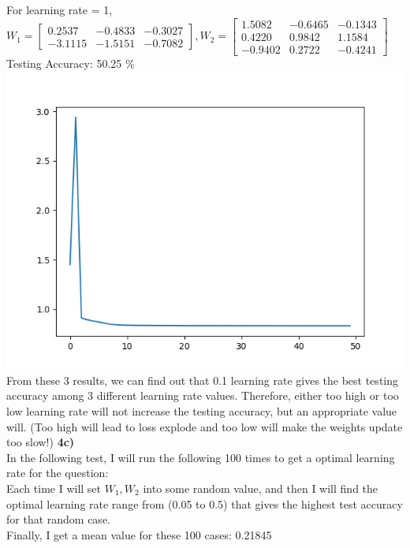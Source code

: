 \documentclass[12pt]{article}
\begin{document}
For learning rate = 1,\\
$W_{1} = \begin{bmatrix}
0.2537 & -0.4833 & -0.3027\\
-3.1115 & -1.5151 & -0.7082
\end{bmatrix}, W_{2} = \begin{bmatrix}
1.5082 & -0.6465 & -0.1343\\
0.4220 & 0.9842 & 1.1584\\
-0.9402 &  0.2722 & -0.4241
\end{bmatrix}$\\        
Testing Accuracy: 50.25 \%\\
\includegraphics[scale=0.5]{train_loss_q4b2}\\[0.2in]
From these 3 results, we can find out that 0.1 learning rate gives the best testing accuracy among 3 different learning rate values. Therefore, either too high or too low learning rate will not increase the testing accuracy, but an appropriate value will. (Too high will lead to loss explode and too low will make the weights update too slow!)\newpage
\textbf{4c)}\\
In the following test, I will run the following 100 times to get a optimal learning rate for the question:\\
\indent Each time I will set $W_{1},W_{2}$ into some random value, and then I will find the optimal learning rate range from (0.05 to 0.5) that gives the highest test accuracy for that random case.\\[0.2in]
Finally, I get a mean value for these 100 cases: 0.21845\\
\end{document}
